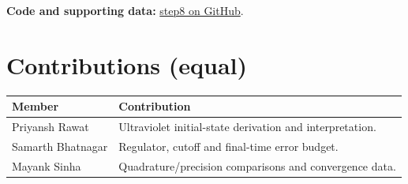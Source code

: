 \documentclass[11pt,a4paper]{article}
\begin{document}
\textbf{Code and supporting data:} \href{https://github.com/rawatpriyansh17/QFT-PROJECT-GROUP-B/tree/main/step8}{step8 on GitHub}.\newpage\section*{Contributions (equal)}\begin{center}\begin{tabularx}{\linewidth}{p{33mm}X}\toprule Member & Contribution\\\midrule Priyansh Rawat & Ultraviolet initial-state derivation and interpretation.\\[3mm]Samarth Bhatnagar & Regulator, cutoff and final-time error budget.\\[3mm]Mayank Sinha & Quadrature/precision comparisons and convergence data.\\\bottomrule\end{tabularx}\end{center}
\end{document}
